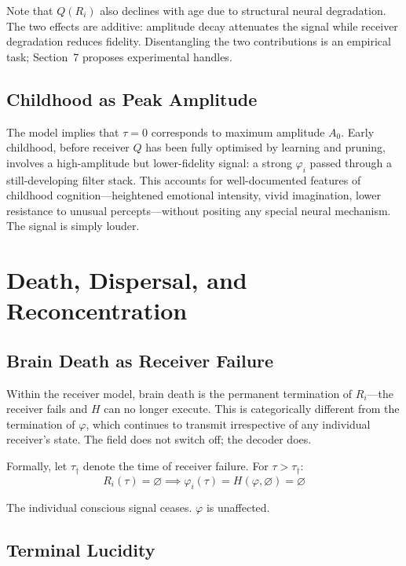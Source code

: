 \documentclass[12pt]{article}
\begin{document}
Note that $Q(R_i)$ also declines with age due to structural neural degradation. The two effects are additive: amplitude decay attenuates the signal while receiver degradation reduces fidelity. Disentangling the two contributions is an empirical task; Section~7 proposes experimental handles.

\subsection{Childhood as Peak Amplitude}

The model implies that $\tau = 0$ corresponds to maximum amplitude $A_0$. Early childhood, before receiver $Q$ has been fully optimised by learning and pruning, involves a high-amplitude but lower-fidelity signal: a strong $\varphi_i$ passed through a still-developing filter stack. This accounts for well-documented features of childhood cognition---heightened emotional intensity, vivid imagination, lower resistance to unusual percepts---without positing any special neural mechanism. The signal is simply louder.

\section{Death, Dispersal, and Reconcentration}

\subsection{Brain Death as Receiver Failure}

Within the receiver model, brain death is the permanent termination of $R_i$---the receiver fails and $H$ can no longer execute. This is categorically different from the termination of $\varphi$, which continues to transmit irrespective of any individual receiver's state. The field does not switch off; the decoder does.

Formally, let $\tau_{\dagger}$ denote the time of receiver failure. For $\tau > \tau_{\dagger}$:
\begin{equation}
    R_i(\tau) = \varnothing \implies \varphi_i(\tau) = H(\varphi, \varnothing) = \varnothing
\end{equation}

The individual conscious signal ceases. $\varphi$ is unaffected.

\subsection{Terminal Lucidity}
\end{document}
